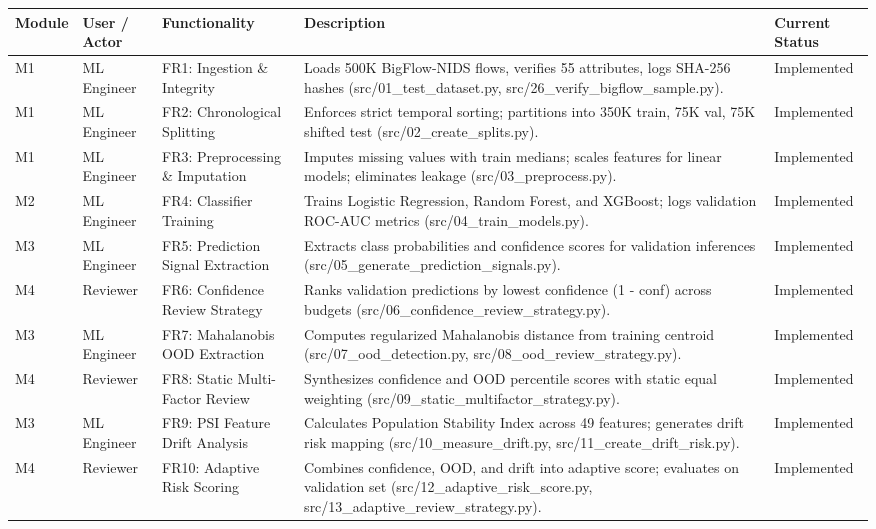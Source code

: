 \begin{table}[H]
\centering
\small
\begin{tabular}{p{} p{} p{} p{} p{}}
\toprule
\textbf{Module} & \textbf{User / Actor} & \textbf{Functionality} & \textbf{Description} & \textbf{Current Status} \\
\midrule
M1 & ML Engineer & FR1: Ingestion \& Integrity & Loads 500K BigFlow-NIDS flows, verifies 55 attributes, logs SHA-256 hashes (src/01\_test\_dataset.py, src/26\_verify\_bigflow\_sample.py). & Implemented \\
M1 & ML Engineer & FR2: Chronological Splitting & Enforces strict temporal sorting; partitions into 350K train, 75K val, 75K shifted test (src/02\_create\_splits.py). & Implemented \\
M1 & ML Engineer & FR3: Preprocessing \& Imputation & Imputes missing values with train medians; scales features for linear models; eliminates leakage (src/03\_preprocess.py). & Implemented \\
M2 & ML Engineer & FR4: Classifier Training & Trains Logistic Regression, Random Forest, and XGBoost; logs validation ROC-AUC metrics (src/04\_train\_models.py). & Implemented \\
M3 & ML Engineer & FR5: Prediction Signal Extraction & Extracts class probabilities and confidence scores for validation inferences (src/05\_generate\_prediction\_signals.py). & Implemented \\
M4 & Reviewer & FR6: Confidence Review Strategy & Ranks validation predictions by lowest confidence (1 - conf) across budgets (src/06\_confidence\_review\_strategy.py). & Implemented \\
M3 & ML Engineer & FR7: Mahalanobis OOD Extraction & Computes regularized Mahalanobis distance from training centroid (src/07\_ood\_detection.py, src/08\_ood\_review\_strategy.py). & Implemented \\
M4 & Reviewer & FR8: Static Multi-Factor Review & Synthesizes confidence and OOD percentile scores with static equal weighting (src/09\_static\_multifactor\_strategy.py). & Implemented \\
M3 & ML Engineer & FR9: PSI Feature Drift Analysis & Calculates Population Stability Index across 49 features; generates drift risk mapping (src/10\_measure\_drift.py, src/11\_create\_drift\_risk.py). & Implemented \\
M4 & Reviewer & FR10: Adaptive Risk Scoring & Combines confidence, OOD, and drift into adaptive score; evaluates on validation set (src/12\_adaptive\_risk\_score.py, src/13\_adaptive\_review\_strategy.py). & Implemented \\

\end{tabular}
\end{table}
